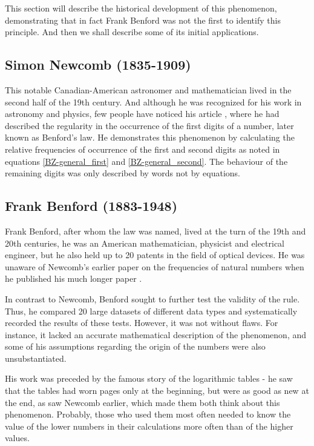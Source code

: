 This section will describe the historical development of this phenomenon, demonstrating that in fact Frank Benford was not the first to identify this principle. And then we shall describe some of its initial applications. \cite{kossovsky2014benford,Hronova2023}

\subsection{Simon Newcomb (1835-1909)}

This notable Canadian-American astronomer and mathematician lived in the second half of the 19th century. And although he was recognized for his work in astronomy and physics, few people have noticed his article \emph{}, where he had described the regularity in the occurrence of the first digits of a number, later known as Benford's law. He demonstrates this phenomenon by calculating the relative frequencies of occurrence of the first and second digits as noted in equations \ref{BZ-general_first} and \ref{BZ-general_second}. The behaviour of the remaining digits was only described by words not by equations. \cite{kossovsky2014benford, Newcomb1881, Hronova2023}  

\subsection{Frank Benford (1883-1948)}

Frank Benford, after whom the law was named, lived at the turn of the 19th and 20th centuries, he was an American mathematician, physicist and electrical engineer, but he also held up to 20 patents in the field of optical devices. He was unaware of Newcomb's earlier paper on the frequencies of natural numbers when he published his much longer paper \emph{}. \cite{kossovsky2014benford, Hronova2023}

In contrast to Newcomb, Benford sought to further test the validity of the rule. Thus, he compared 20 large datasets of different data types and systematically recorded the results of these tests. However, it was not without flaws. For instance, it lacked an accurate mathematical description of the phenomenon, and some of his assumptions regarding the origin of the numbers were also unsubstantiated. \cite{kossovsky2014benford, Hronova2023}

His work was preceded by the famous story of the logarithmic tables - he saw that the tables had worn pages only at the beginning, but were as good as new at the end, as saw Newcomb earlier, which made them both think about this phenomenon. Probably, those who used them most often needed to know the value of the lower numbers in their calculations more often than of the higher values.  \cite{Hronova2023}

